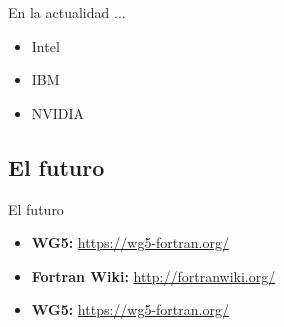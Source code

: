 \begin{frame}[fragile]{En la actualidad ...}
  \begin{itemize}[<+(1)->]
    \item Intel
    \item IBM
    \item NVIDIA
  \end{itemize}
\end{frame}


\subsection{El futuro}
\begin{frame}[fragile]{El futuro}
  \begin{itemize}[<+(1)->]
    \item \textbf{WG5: }\url{https://wg5-fortran.org/}
    \item \textbf{Fortran Wiki: }\url{http://fortranwiki.org/}
    \item \textbf{WG5: }\url{https://wg5-fortran.org/}
  \end{itemize}
\end{frame}

